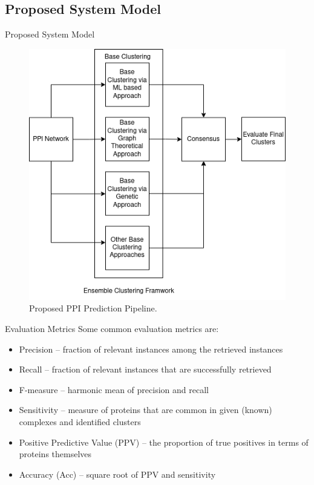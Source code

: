\documentclass[aspectratio=169]{beamer}
\begin{document}
\subsection{Proposed System Model}
\begin{frame}{Proposed System Model}
\begin{figure}[h!]
    \centering
\includegraphics[scale=0.4]{Documentation/Presentation/algo-pipeline.png}
\caption{Proposed PPI Prediction Pipeline.}
\label{fig: algo_pipelinediag}
\end{figure}
\end{frame}



\begin{frame}{Evaluation Metrics}
    Some common evaluation metrics are:
    \begin{itemize}
        \item Precision -- fraction of relevant instances among the retrieved instances
        \item Recall -- fraction of relevant instances that are successfully retrieved 
        \item F-measure -- harmonic mean of precision and recall 
        \item Sensitivity -- measure of proteins that are common in given (known) complexes and identified clusters 
        \item Positive Predictive Value (PPV) -- the proportion of true positives in terms of proteins themselves
        \item Accuracy (Acc) -- square root of PPV and sensitivity
    \end{itemize}
\end{frame}
\end{document}
